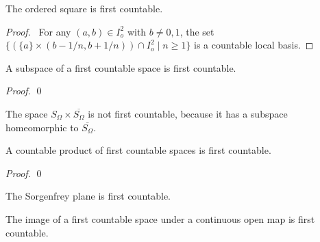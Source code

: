 \begin{example}
    The ordered square is first countable.
\end{example}

\begin{proof}
    \pf\ For any $(a,b) \in I_o^2$ with $b \neq 0,1$, the set $\{ (\{a\} \times (b - 1/n,b + 1/n)) \cap I_o^2 \mid n \geq 1 \}$ is a countable local basis.
\end{proof}

\begin{proposition}
    A subspace of a first countable space is first countable.
\end{proposition}

\begin{proof}
    \pf
    \qed
\end{proof}

\begin{example}
    The space $S_\Omega \times \overline{S_\Omega}$ is not first countable, because it has a subspace homeomorphic
    to $\overline{S_\Omega}$.
\end{example}

\begin{proposition}[AC]
    A countable product of first countable spaces is first countable.
\end{proposition}

\begin{proof}
    \pf
    \qed
\end{proof}

\begin{corollary}
    The Sorgenfrey plane is first countable.
\end{corollary}

\begin{proposition}
    The image of a first countable space under a continuous open map is first countable.
\end{proposition}

